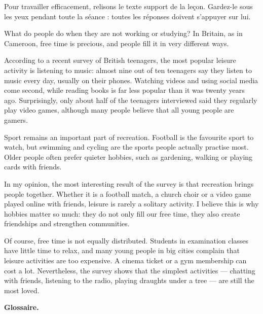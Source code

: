 \documentclass[11pt]{article}
\newcounter{popsec}
\newcounter{popsub}
\newcommand{\courssub}[1]{%
  \stepcounter{popsub}%
  \par\vspace{9pt}\noindent{\popxbold\fontsize{11.5}{13}\selectfont\color{popink}{\color{poporange}\thepopsec.\thepopsub}\hspace{6pt}#1}\par\nopagebreak\vspace{4pt}
}
\begin{document}
\courssub{The reference text: a quick reminder}

Pour travailler efficacement, relisons le texte support de la leçon. Gardez-le sous les yeux pendant toute la séance : toutes les réponses doivent s'appuyer sur lui.

\begin{textebox}
What do people do when they are not working or studying? In Britain, as in Cameroon, free time is precious, and people fill it in very different ways.

According to a recent survey of British teenagers, the most popular leisure activity is listening to music: almost nine out of ten teenagers say they listen to music every day, usually on their phones. Watching videos and using social media come second, while reading books is far less popular than it was twenty years ago. Surprisingly, only about half of the teenagers interviewed said they regularly play video games, although many people believe that all young people are gamers.

Sport remains an important part of recreation. Football is the favourite sport to watch, but swimming and cycling are the sports people actually practise most. Older people often prefer quieter hobbies, such as gardening, walking or playing cards with friends.

In my opinion, the most interesting result of the survey is that recreation brings people together. Whether it is a football match, a church choir or a video game played online with friends, leisure is rarely a solitary activity. I believe this is why hobbies matter so much: they do not only fill our free time, they also create friendships and strengthen communities.

Of course, free time is not equally distributed. Students in examination classes have little time to relax, and many young people in big cities complain that leisure activities are too expensive. A cinema ticket or a gym membership can cost a lot. Nevertheless, the survey shows that the simplest activities — chatting with friends, listening to the radio, playing draughts under a tree — are still the most loved.
\end{textebox}

\textbf{Glossaire.}
\end{document}
